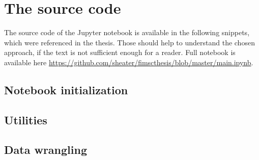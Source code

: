 \documentclass[
  digital, %
  oneside, %
  lof,     %
  lot,     %
]{fithesis4}
\begin{document}
\newpage
\section{The source code}

The source code of the Jupyter notebook is available in the following snippets, which were referenced in the thesis.
Those should help to understand the chosen approach, if the text is not sufficient enough for a reader.
Full notebook is available here \url{https://github.com/sheater/fimscthesis/blob/master/main.ipynb}.


\subsection{Notebook initialization}




\subsection{Utilities}









% 


\subsection{Data wrangling}













\end{document}
